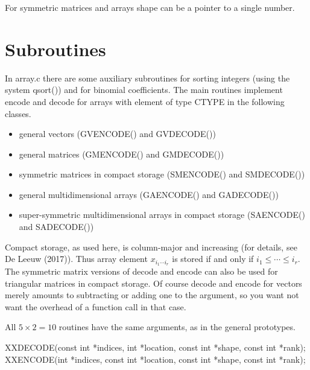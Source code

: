 \documentclass[
  12pt,
]{article}
\newenvironment{Shaded}{\begin{snugshade}}{\end{snugshade}}
\newcommand{\DataTypeTok}[1]{\textcolor[rgb]{0.13,0.29,0.53}{#1}}
\newcommand{\NormalTok}[1]{#1}
\providecommand{\tightlist}{%
  \setlength{\itemsep}{0pt}\setlength{\parskip}{0pt}}
\begin{document}
For symmetric matrices and arrays shape can be a pointer to a single
number.

\hypertarget{subroutines}{%
\section{Subroutines}\label{subroutines}}

In array.c there are some auxiliary subroutines for sorting integers
(using the system qsort()) and for binomial coefficients. The main
routines implement encode and decode for arrays with element of type
CTYPE in the following classes.

\begin{itemize}
\tightlist
\item
  general vectors (GVENCODE() and GVDECODE())
\item
  general matrices (GMENCODE() and GMDECODE())
\item
  symmetric matrices in compact storage (SMENCODE() and SMDECODE())
\item
  general multidimensional arrays (GAENCODE() and GADECODE())
\item
  super-symmetric multidimensional arrays in compact storage (SAENCODE()
  and SADECODE())
\end{itemize}

Compact storage, as used here, is column-major and increasing (for
details, see De Leeuw (2017)). Thus array element \(x_{i_1\cdots i_r}\)
is stored if and only if \(i_1\leq\cdots\leq i_r\). The symmetric matrix
versions of decode and encode can also be used for triangular matrices
in compact storage. Of course decode and encode for vectors merely
amounts to subtracting or adding one to the argument, so you want not
want the overhead of a function call in that case.

All \(5\times 2=10\) routines have the same arguments, as in the general
prototypes.

\begin{Shaded}
\begin{Highlighting}[]
\NormalTok{XXDECODE(}\DataTypeTok{const} \DataTypeTok{int}\NormalTok{ *indices, }\DataTypeTok{int}\NormalTok{ *location, }\DataTypeTok{const} \DataTypeTok{int}\NormalTok{ *shape, }\DataTypeTok{const} \DataTypeTok{int}\NormalTok{ *rank);}
\NormalTok{XXENCODE(}\DataTypeTok{int}\NormalTok{ *indices, }\DataTypeTok{const} \DataTypeTok{int}\NormalTok{ *location, }\DataTypeTok{const} \DataTypeTok{int}\NormalTok{ *shape, }\DataTypeTok{const} \DataTypeTok{int}\NormalTok{ *rank);}
\end{Highlighting}
\end{Shaded}
\end{document}
